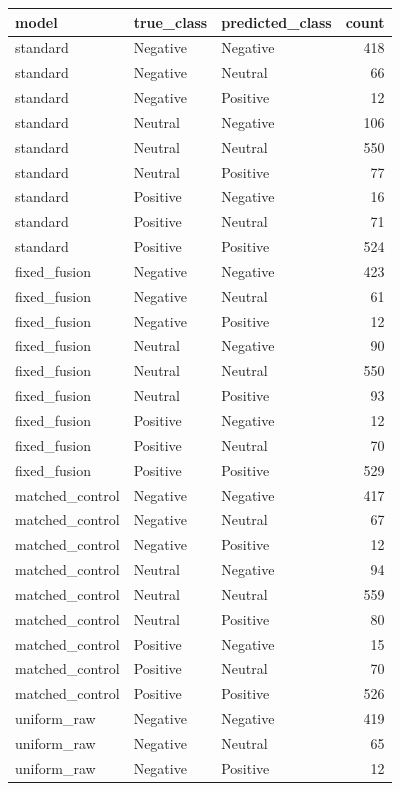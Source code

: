 \begin{tabular}{lllr}
\toprule
model & true\_class & predicted\_class & count \\
\midrule
standard & Negative & Negative & 418 \\
standard & Negative & Neutral & 66 \\
standard & Negative & Positive & 12 \\
standard & Neutral & Negative & 106 \\
standard & Neutral & Neutral & 550 \\
standard & Neutral & Positive & 77 \\
standard & Positive & Negative & 16 \\
standard & Positive & Neutral & 71 \\
standard & Positive & Positive & 524 \\
fixed\_fusion & Negative & Negative & 423 \\
fixed\_fusion & Negative & Neutral & 61 \\
fixed\_fusion & Negative & Positive & 12 \\
fixed\_fusion & Neutral & Negative & 90 \\
fixed\_fusion & Neutral & Neutral & 550 \\
fixed\_fusion & Neutral & Positive & 93 \\
fixed\_fusion & Positive & Negative & 12 \\
fixed\_fusion & Positive & Neutral & 70 \\
fixed\_fusion & Positive & Positive & 529 \\
matched\_control & Negative & Negative & 417 \\
matched\_control & Negative & Neutral & 67 \\
matched\_control & Negative & Positive & 12 \\
matched\_control & Neutral & Negative & 94 \\
matched\_control & Neutral & Neutral & 559 \\
matched\_control & Neutral & Positive & 80 \\
matched\_control & Positive & Negative & 15 \\
matched\_control & Positive & Neutral & 70 \\
matched\_control & Positive & Positive & 526 \\
uniform\_raw & Negative & Negative & 419 \\
uniform\_raw & Negative & Neutral & 65 \\
uniform\_raw & Negative & Positive & 12 \\

\end{tabular}
